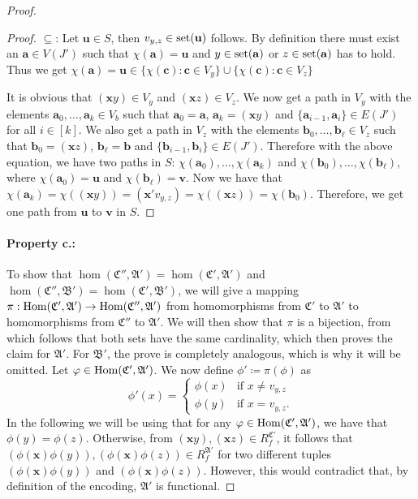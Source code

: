 \begin{proof}
\begin{proof}
		$\subseteq$:
		Let $\mathbf u\in S$, then $v_{y,z}\in \operatorname{set}(\mathbf u)$ follows.
		By definition there must exist an $\mathbf a \in V(J')$ such that $\chi(\mathbf a)=\mathbf u$ and $y\in \operatorname{set}(\mathbf a)$ or $z\in \operatorname{set}(\mathbf a)$ has to hold.
		Thus we get $\chi(\mathbf a)=\mathbf u\in \{\chi(\mathbf c) : \mathbf c\in V_y\}\cup \{\chi(\mathbf c) : \mathbf c\in V_z\}$
		
		It is obvious that $(\mathbf xy)\in V_y$ and $(\mathbf xz)\in V_z$.
		We now get a path in $V_y$ with the elements $\mathbf a_0,\dots,\mathbf a_k\in V_b$ such that $\mathbf a_0=\mathbf a$, $\mathbf a_k=(\mathbf xy)$ and $\{\mathbf a_{i-1},\mathbf a_i\}\in E(J')$ for all $i\in [k]$.
		We also get a path in $V_z$ with the elements $\mathbf b_0,\dots,\mathbf b_\ell\in V_z$ such that $\mathbf b_0=(\mathbf xz)$, $\mathbf b_\ell = \mathbf b$ and $\{\mathbf b_{i-1},\mathbf b_i\}\in E(J')$.
		Therefore with the above equation, we have two paths in $S$: $\chi(\mathbf a_0),\dots,\chi(\mathbf a_k)$ and $\chi(\mathbf b_0),\dots,\chi(\mathbf b_\ell)$, where $\chi(\mathbf a_0)=\mathbf u$ and $\chi(\mathbf b_\ell)=\mathbf v$.
		Now we have that $\chi(\mathbf a_k)=\chi((\mathbf xy))=(\mathbf x'v_{y,z})=\chi((\mathbf xz))=\chi(\mathbf b_0)$.
		Therefore, we get one path from $\mathbf u$ to $\mathbf v$ in $S$.
	\end{proof}
	
	\paragraph*{Property c.:}
	To show that $\hom(\mathfrak C'',\mathfrak A')=\hom(\mathfrak C',\mathfrak A')$ and $\hom(\mathfrak C'',\mathfrak B')=\hom(\mathfrak C',\mathfrak B')$, we will give a mapping $\pi : \operatorname{Hom}(\mathfrak C',\mathfrak A')\to\operatorname{Hom}(\mathfrak C'',\mathfrak A')$ from homomorphisms from $\mathfrak C'$ to $\mathfrak A'$ to homomorphisms from $\mathfrak C''$ to $\mathfrak A'$.
	We will then show that $\pi$ is a bijection, from which follows that both sets have the same cardinality, which then proves the claim for $\mathfrak A'$.
	For $\mathfrak B'$, the prove is completely analogous, which is why it will be omitted.
	Let $\varphi\in \operatorname{Hom}(\mathfrak C',\mathfrak A')$.
	We now define $\phi'\coloneqq \pi(\phi)$ as
	$$
	\phi'(x)=
	\begin{cases}
		\phi(x) & \text{if } x\neq v_{y,z} \\
		\phi(y) & \text{if } x = v_{y,z}.
	\end{cases}
	$$
	In the following we will be using that for any $\varphi\in\operatorname{Hom}(\mathfrak C',\mathfrak A')$, we have that $\phi(y)=\phi(z)$.
	Otherwise, from $(\mathbf xy),(\mathbf xz)\in R_f^{\mathfrak C'}$, it follows that $(\phi(\mathbf x)\phi(y)),(\phi(\mathbf x)\phi(z))\in R_f^{\mathfrak A'}$ for two different tuples $(\phi(\mathbf x)\phi(y))$ and $(\phi(\mathbf x)\phi(z))$.
	However, this would contradict that, by definition of the encoding, $\mathfrak A'$ is functional.
	

\end{proof}
